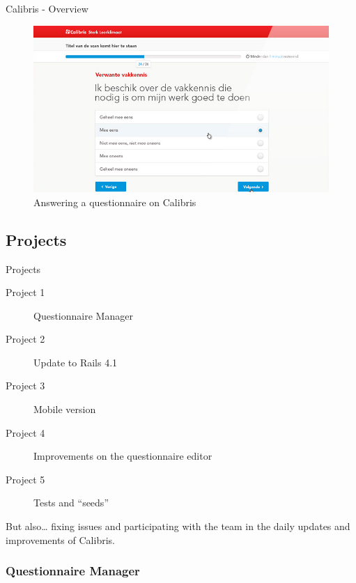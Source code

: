\documentclass[10pt,a4paper]{beamer}
\begin{document}
\begin{frame}{Calibris - Overview}
  \begin{figure}[htp]
  \centering
  \includegraphics[scale=0.4]{../img/calibris2.png}
   \caption{Answering a questionnaire on Calibris}
   \label{fig.calibris2}
  \end{figure}
\end{frame}

\subsection{Projects}

\begin{frame}{Projects}
  \begin{description}
    \item[Project 1] Questionnaire Manager
    \item[Project 2] Update to Rails 4.1
    \item[Project 3] Mobile version
    \item[Project 4] Improvements on the questionnaire editor
    \item[Project 5] Tests and ``seeds''
  \end{description}
  But also… fixing issues and participating with the team in the daily updates and improvements of Calibris.
\end{frame}

\subsubsection{Questionnaire Manager}
\end{document}
